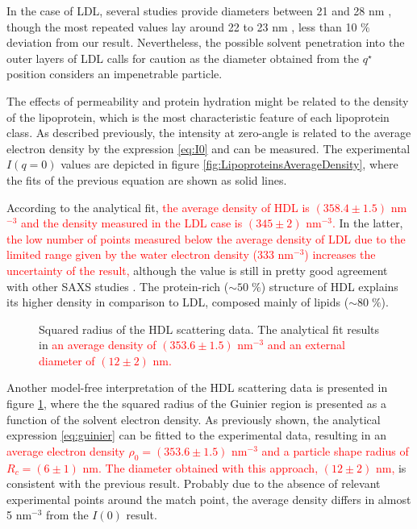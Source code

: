 In the case of LDL, several studies provide diameters between 21 and 28 nm \citep{tardieu_structure_1976,colhoun_lipoprotein_2002,german_lipoproteins:_2006}, though the most repeated values lay around 22 to 23 nm \citep{muller_structure_1978,luzzati_structure_1979}, less than 10 $\%$ deviation from our result. Nevertheless, the possible solvent penetration into the outer layers of LDL \citep{stuhrmann_neutron_1975,tardieu_structure_1976} calls for caution as the diameter obtained from the $q^{\star}$ position considers an impenetrable particle.

The effects of permeability and protein hydration might be related to the density of the lipoprotein, which is the most characteristic feature of each lipoprotein class. As described previously, the intensity at zero-angle is related to the average electron density by the expression \ref{eq:I0} and can be measured. The experimental $I(q=0)$ values are depicted in figure \ref{fig:LipoproteinsAverageDensity}, where the fits of the previous equation are shown as solid lines. 

According to the analytical fit, \textcolor{red}{the average density of HDL is $\left( 358.4 \pm 1.5 \right)$ nm$^{-3}$ and the density measured in the LDL case is $\left(345 \pm 2 \right)$ nm$^{-3}$.} In the latter, \textcolor{red}{the low number of points measured below the average density of LDL due to the limited range given by the water electron density (333 nm$^{-3}$) increases the uncertainty of the result,} although the value is still in pretty good agreement with other SAXS studies \citep{tardieu_structure_1976,luzzati_structure_1979}. The protein-rich ($\sim 50 \; \% $) structure of HDL explains its higher density in comparison to LDL, composed mainly of lipids ($\sim 80 \; \% $).

\begin{figure}
	\centering
		
\caption[Squared radius of the HDL scattering data.]{Squared radius of the HDL scattering data. The analytical fit results in \textcolor{red}{an average density of $\left(353.6 \pm 1.5 \right)$ nm$^{-3}$ and an external diameter of $\left(12 \pm 2 \right)$ nm.}}
		\label{fig:HDLGuinierRadius}
\end{figure}

Another model-free interpretation of the HDL scattering data is presented in figure \ref{fig:HDLGuinierRadius}, where the the squared radius of the Guinier region is presented as a function of the solvent electron density. As previously shown, the analytical expression \ref{eq:guinier} can be fitted to the experimental data, resulting in an \textcolor{red}{average electron density $\rho_0=\left(353.6 \pm 1.5 \right)$ nm$^{-3}$ and a particle shape radius of $R_c=\left(6 \pm 1 \right)$ nm. The diameter obtained with this approach, $\left(12 \pm 2 \right)$ nm,} is consistent with the previous result. Probably due to the absence of relevant experimental points around the match point, the average density differs in almost 5 nm$^{-3}$ from the $I(0)$ result.

